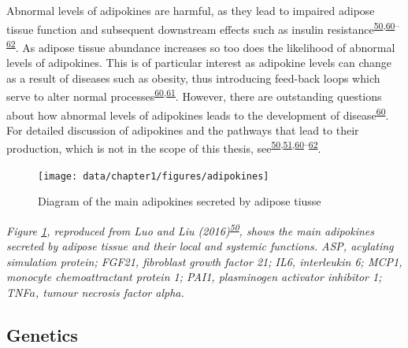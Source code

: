 \documentclass[11pt,twoside]{bristolthesis}
\newcommand{\bsmall}{\begin{small}}
\newcommand{\esmall}{\end{small}}
\begin{document}
Abnormal levels of adipokines are harmful, as they lead to impaired adipose tissue function and subsequent downstream effects such as insulin resistance\textsuperscript{\protect\hyperlink{ref-Luo2016}{50},\protect\hyperlink{ref-Fasshauer2015}{60}--\protect\hyperlink{ref-Bluher2015}{62}}. As adipose tissue abundance increases so too does the likelihood of abnormal levels of adipokines. This is of particular interest as adipokine levels can change as a result of diseases such as obesity, thus introducing feed-back loops which serve to alter normal processes\textsuperscript{\protect\hyperlink{ref-Fasshauer2015}{60},\protect\hyperlink{ref-Bluher2013}{61}}. However, there are outstanding questions about how abnormal levels of adipokines leads to the development of disease\textsuperscript{\protect\hyperlink{ref-Fasshauer2015}{60}}. For detailed discussion of adipokines and the pathways that lead to their production, which is not in the scope of this thesis, see\textsuperscript{\protect\hyperlink{ref-Luo2016}{50},\protect\hyperlink{ref-Kershaw2004}{51},\protect\hyperlink{ref-Fasshauer2015}{60}--\protect\hyperlink{ref-Bluher2015}{62}}.

\par
\begin{figure}
\texttt{[image: data/chapter1/figures/adipokines]} \caption{Diagram of the main adipokines secreted by adipose tiusse}\label{fig:adipokines}
\end{figure}
\noindent
\bsmall
\emph{Figure \ref{fig:adipokines}, reproduced from Luo and Liu (2016)\textsuperscript{\protect\hyperlink{ref-Luo2016}{50}}, shows the main adipokines secreted by adipose tissue and their local and systemic functions. ASP, acylating simulation protein; FGF21, fibroblast growth factor 21; IL6, interleukin 6; MCP1, monocyte chemoattractant protein 1; PAI1, plasminogen activator inhibitor 1; TNF\(a\), tumour necrosis factor alpha.}
\esmall

\hypertarget{genetics}{%
\subsection{Genetics}\label{genetics}}
\end{document}
